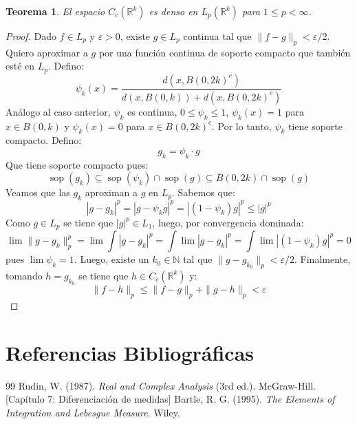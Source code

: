 \documentclass[12pt,a4paper]{article}
\theoremstyle{profesional}
\newtheorem{teorema}{Teorema}[section]
\theoremstyle{definicion-style}
\newcommand{\R}{\mathbb{R}}
\newcommand{\N}{\mathbb{N}}
\begin{document}
\begin{teorema}
    El espacio \( C_c(\R^k) \) es denso en \( L_p(\R^k) \) para \( 1 \leq p < \infty \).
\end{teorema}
\begin{proof}
    Dado \( f \in L_p \) y \( \varepsilon > 0 \), existe \( g \in L_p \) continua tal que \( \| f - g \|_p < \varepsilon / 2 \).
    Quiero aproximar a \( g \) por una función continua de soporte compacto que también esté en \( L_p \). Defino: \[
        \psi_k(x) = \dfrac{d(x, {B(0, 2k)}^c)}{d(x, B(0, k)) + d(x, {B(0, 2k)}^c)}
    \]
    Análogo al caso anterior, \( \psi_k \) es continua, \( 0 \leq \psi_k \leq 1 \), \( \psi_k(x) = 1 \) para \( x \in B(0, k) \) y
    \( \psi_k(x) = 0 \) para \( x \in {B(0, 2k)}^c \). Por lo tanto, \( \psi_k \) tiene soporte compacto. Defino: \[
        g_k = \psi_k \cdot g
    \]
    Que tiene soporte compacto pues: \[
        \operatorname{sop}(g_k) \subseteq \operatorname{sop}(\psi_k) \cap \operatorname{sop}(g) \subseteq \overline{B}(0, 2k) \cap \operatorname{sop}(g)
    \]
    Veamos que las \( g_k \) aproximan a \( g \) en \( L_p \). Sabemos que: \[
        |g - g_k|^p = |g - \psi_k g|^p = |(1 - \psi_k) g|^p \leq |g|^p
    \]
    Como \( g \in L_p \) se tiene que \( |g|^p \in L_1 \), luego, por convergencia dominada: \[
        \lim \| g - g_k \|_p^p = \lim \int |g - g_k|^p = \int \lim |g - g_k|^p = \int \lim |(1 - \psi_k) g|^p = 0
    \]
    pues \( \lim \psi_k = 1 \). Luego, existe un \( k_0 \in \N \) tal que \( \| g - g_{k_0} \|_p < \varepsilon / 2 \). Finalmente, tomando \( h = g_{k_0} \) se tiene que \( h \in C_c(\R^k) \) y: \[
        \| f - h \|_p \leq \| f - g \|_p + \| g - h \|_p < \varepsilon
    \]
\end{proof}

\section*{Referencias Bibliográficas}

\begin{thebibliography}{99}
     Rudin, W. (1987). \textit{Real and Complex Analysis} (3rd ed.). McGraw-Hill. [Capítulo 7: Diferenciación de medidas]
     Bartle, R. G. (1995). \textit{The Elements of Integration and Lebesgue Measure}. Wiley.
\end{thebibliography}
\end{document}
